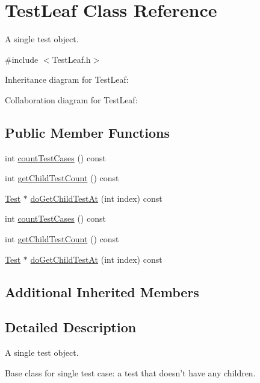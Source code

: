 \hypertarget{class_test_leaf}{\section{Test\+Leaf Class Reference}
\label{class_test_leaf}
}


A single test object.  




{\ttfamily \#include $<$Test\+Leaf.\+h$>$}



Inheritance diagram for Test\+Leaf\+:


Collaboration diagram for Test\+Leaf\+:
\subsection*{Public Member Functions}
\begin{DoxyCompactItemize}
\item 
int \hyperlink{class_test_leaf_a5528fbeef4277cc42dad76b367633615}{count\+Test\+Cases} () const 
\item 
int \hyperlink{class_test_leaf_a74463f8aa3dae0f727f26a184233749a}{get\+Child\+Test\+Count} () const 
\item 
\hyperlink{class_test}{Test} $\ast$ \hyperlink{class_test_leaf_a940d2528cf84ee28f97c904ceca76089}{do\+Get\+Child\+Test\+At} (int index) const 
\item 
int \hyperlink{class_test_leaf_aecf22f6d00f9a35d89c00c4b83e34aff}{count\+Test\+Cases} () const 
\item 
int \hyperlink{class_test_leaf_a74463f8aa3dae0f727f26a184233749a}{get\+Child\+Test\+Count} () const 
\item 
\hyperlink{class_test}{Test} $\ast$ \hyperlink{class_test_leaf_ac6c850de11b23821255839205fb319d5}{do\+Get\+Child\+Test\+At} (int index) const 
\end{DoxyCompactItemize}
\subsection*{Additional Inherited Members}


\subsection{Detailed Description}
A single test object. 

Base class for single test case\+: a test that doesn't have any children. 

